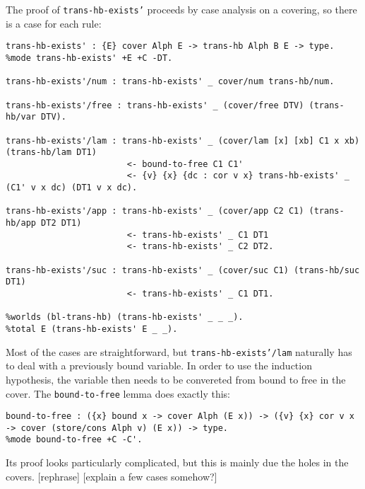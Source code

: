The proof of \texttt{trans-hb-exists'} proceeds by case analysis on a covering, so there is a case for each rule:
\begin{verbatim}
trans-hb-exists' : {E} cover Alph E -> trans-hb Alph B E -> type.
%mode trans-hb-exists' +E +C -DT.

trans-hb-exists'/num : trans-hb-exists' _ cover/num trans-hb/num.

trans-hb-exists'/free : trans-hb-exists' _ (cover/free DTV) (trans-hb/var DTV).

trans-hb-exists'/lam : trans-hb-exists' _ (cover/lam [x] [xb] C1 x xb) (trans-hb/lam DT1)
                        <- bound-to-free C1 C1'
                        <- {v} {x} {dc : cor v x} trans-hb-exists' _ (C1' v x dc) (DT1 v x dc).

trans-hb-exists'/app : trans-hb-exists' _ (cover/app C2 C1) (trans-hb/app DT2 DT1)
                        <- trans-hb-exists' _ C1 DT1
                        <- trans-hb-exists' _ C2 DT2.

trans-hb-exists'/suc : trans-hb-exists' _ (cover/suc C1) (trans-hb/suc DT1)
                        <- trans-hb-exists' _ C1 DT1.

%worlds (bl-trans-hb) (trans-hb-exists' _ _ _).
%total E (trans-hb-exists' E _ _).
\end{verbatim}
Most of the cases are straightforward, but \texttt{trans-hb-exists'/lam} naturally has to deal with a previously bound variable.
In order to use the induction hypothesis, the variable then needs to be convereted from bound to free in the cover.
The \texttt{bound-to-free} lemma does exactly this:
\begin{verbatim}
bound-to-free : ({x} bound x -> cover Alph (E x)) -> ({v} {x} cor v x -> cover (store/cons Alph v) (E x)) -> type.
%mode bound-to-free +C -C'.
\end{verbatim}
Its proof looks particularly complicated, but this is mainly due the holes in the covers. [rephrase]
[explain a few cases somehow?]
